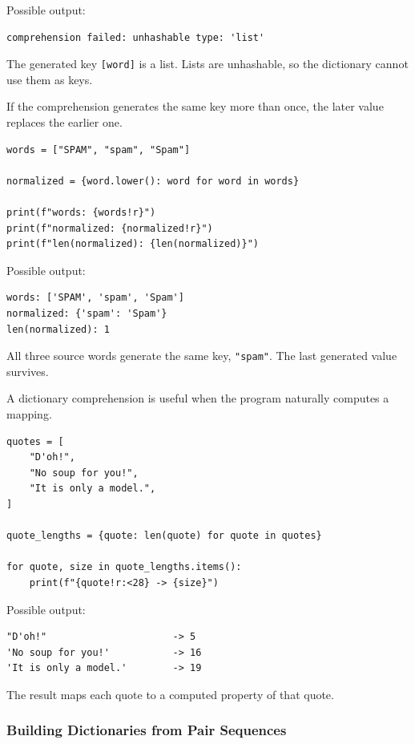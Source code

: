 Possible output:

\begin{verbatim}
comprehension failed: unhashable type: 'list'
\end{verbatim}

The generated key \texttt{[word]} is a list. Lists are unhashable, so the dictionary cannot use them as keys.

If the comprehension generates the same key more than once, the later value replaces the earlier one.

\begin{verbatim}
words = ["SPAM", "spam", "Spam"]

normalized = {word.lower(): word for word in words}

print(f"words: {words!r}")
print(f"normalized: {normalized!r}")
print(f"len(normalized): {len(normalized)}")
\end{verbatim}

Possible output:

\begin{verbatim}
words: ['SPAM', 'spam', 'Spam']
normalized: {'spam': 'Spam'}
len(normalized): 1
\end{verbatim}

All three source words generate the same key, \texttt{"spam"}. The last generated value survives.

A dictionary comprehension is useful when the program naturally computes a mapping.

\begin{verbatim}
quotes = [
    "D'oh!",
    "No soup for you!",
    "It is only a model.",
]

quote_lengths = {quote: len(quote) for quote in quotes}

for quote, size in quote_lengths.items():
    print(f"{quote!r:<28} -> {size}")
\end{verbatim}

Possible output:

\begin{verbatim}
"D'oh!"                      -> 5
'No soup for you!'           -> 16
'It is only a model.'        -> 19
\end{verbatim}

The result maps each quote to a computed property of that quote.

\subsubsection{Building Dictionaries from Pair Sequences}

